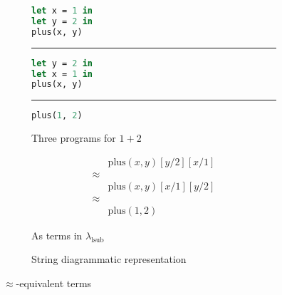 \begin{figure}
	\centering
	\begin{subfigure}{0.3\linewidth}
		\begin{lstlisting}[language=ML]
let x = 1 in
let y = 2 in
plus(x, y)
                \end{lstlisting}
		\hrule
		\begin{lstlisting}[language=ML]
let y = 2 in
let x = 1 in
plus(x, y)
                \end{lstlisting}
		\hrule
		\begin{lstlisting}[language=ML]
plus(1, 2)
                \end{lstlisting}
		\caption{Three programs for $1 + 2$}%
		\label{fig:plus-1-2-programs}
	\end{subfigure}
	\hspace{2em}
	\begin{subfigure}{0.2\linewidth}
		\begin{align*}
			        & \text{plus}(x, y)[y/2][x/1] \\
			\approx &                             \\
			        & \text{plus}(x, y)[x/1][y/2] \\
			\approx &                             \\
			        & \text{plus}(1, 2)
		\end{align*}
		\caption{As terms in $\lambda_{\text{lsub}}$}%
		\label{fig:plus-1-2-terms}
	\end{subfigure}
	\hspace{2em}
	\begin{subfigure}{0.2\linewidth}
		\centering
		\caption{String diagrammatic representation}%
		\label{fig:plus-1-2-string-diagram}
	\end{subfigure}
	\caption{$\approx$-equivalent terms}%
	\label{fig:plus-1-2}
\end{figure}

